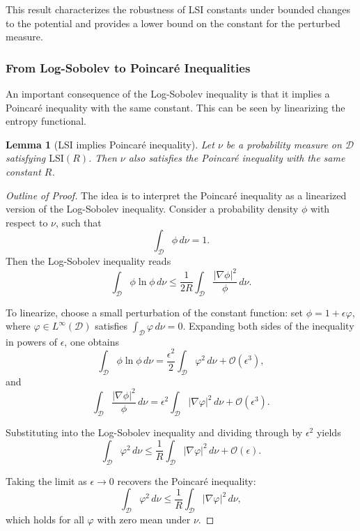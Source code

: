 \documentclass[11pt, twoside]{report}
\newtheorem{lemma}[theorem]{Lemma}
\begin{document}
This result characterizes the robustness of LSI constants under bounded changes to the potential and provides a lower bound on the constant for the perturbed measure.


\subsubsection{From Log-Sobolev to Poincaré Inequalities}

An important consequence of the Log-Sobolev inequality is that it implies a Poincaré inequality with the same constant. This can be seen by linearizing the entropy functional.

\begin{lemma}[LSI implies Poincaré inequality]
Let $\nu$ be a probability measure on $\mathcal{D}$ satisfying $\mathrm{LSI}(R)$. Then $\nu$ also satisfies the Poincaré inequality with the same constant $R$.
\end{lemma}

\begin{proof}[Outline of Proof]
The idea is to interpret the Poincaré inequality as a linearized version of the Log-Sobolev inequality. Consider a probability density $\phi$ with respect to $\nu$, such that
\[
\int_\mathcal{D} \phi \, d\nu = 1.
\]
Then the Log-Sobolev inequality reads
\[
\int_\mathcal{D} \phi \ln \phi \, d\nu \leq \frac{1}{2R} \int_\mathcal{D} \frac{|\nabla \phi|^2}{\phi} \, d\nu.
\]

To linearize, choose a small perturbation of the constant function: set $\phi = 1 + \epsilon \varphi$, where $\varphi \in L^\infty(\mathcal{D})$ satisfies $\int_\mathcal{D} \varphi \, d\nu = 0$. Expanding both sides of the inequality in powers of $\epsilon$, one obtains
\[
\int_\mathcal{D} \phi \ln \phi \, d\nu = \frac{\epsilon^2}{2} \int_\mathcal{D} \varphi^2 \, d\nu + \mathcal{O}(\epsilon^3),
\]
and
\[
\int_\mathcal{D} \frac{|\nabla \phi|^2}{\phi} \, d\nu = \epsilon^2 \int_\mathcal{D} |\nabla \varphi|^2 \, d\nu + \mathcal{O}(\epsilon^3).
\]

Substituting into the Log-Sobolev inequality and dividing through by $\epsilon^2$ yields
\[
\int_\mathcal{D} \varphi^2 \, d\nu \leq \frac{1}{R} \int_\mathcal{D} |\nabla \varphi|^2 \, d\nu + \mathcal{O}(\epsilon).
\]

Taking the limit as $\epsilon \to 0$ recovers the Poincaré inequality:
\[
\int_\mathcal{D} \varphi^2 \, d\nu \leq \frac{1}{R} \int_\mathcal{D} |\nabla \varphi|^2 \, d\nu,
\]
which holds for all $\varphi$ with zero mean under $\nu$.
\end{proof}
\end{document}

